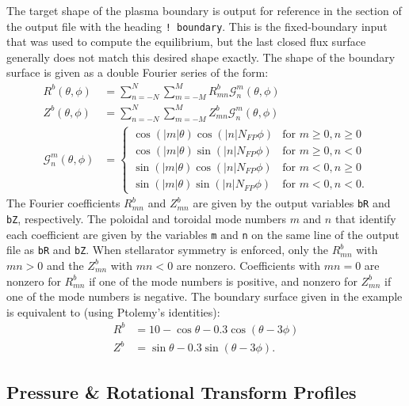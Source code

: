 \documentclass[10pt,a4paper]{article}
\begin{document}
The target shape of the plasma boundary is output for reference in the section of the output file with the heading \verb|! boundary|.  
This is the fixed-boundary input that was used to compute the equilibrium, but the last closed flux surface generally does not match this desired shape exactly.  
The shape of the boundary surface is given as a double Fourier series of the form: 
%
\begin{subequations}
\begin{align}
R^b(\theta,\phi) &= \sum_{n=-N}^{N} \sum_{m=-M}^{M} R^{b}_{mn} \mathcal{G}^{m}_{n}(\theta,\phi) \\
Z^b(\theta,\phi) &= \sum_{n=-N}^{N} \sum_{m=-M}^{M} Z^{b}_{mn} \mathcal{G}^{m}_{n}(\theta,\phi) \\
\label{eq:G}
\mathcal{G}^{m}_{n}(\theta,\phi) &= \begin{cases}
\cos(|m|\theta)\cos(|n|N_{FP}\phi) &\text{for }m\ge0, n\ge0 \\
\cos(|m|\theta)\sin(|n|N_{FP}\phi) &\text{for }m\ge0, n<0 \\
\sin(|m|\theta)\cos(|n|N_{FP}\phi) &\text{for }m<0, n\ge0 \\
\sin(|m|\theta)\sin(|n|N_{FP}\phi) &\text{for }m<0, n<0.
\end{cases}
\end{align}
\end{subequations}
%
The Fourier coefficients $R^{b}_{mn}$ and $Z^{b}_{mn}$ are given by the output variables \verb|bR| and \verb|bZ|, respectively.  
The poloidal and toroidal mode numbers $m$ and $n$ that identify each coefficient are given by the variables \verb|m| and \verb|n| on the same line of the output file as \verb|bR| and \verb|bZ|.  
When stellarator symmetry is enforced, only the $R^{b}_{mn}$ with $mn > 0$ and the $Z^{b}_{mn}$ with $mn < 0$ are nonzero.  
Coefficients with $mn = 0$ are nonzero for $R^{b}_{mn}$ if one of the mode numbers is positive, and nonzero for $Z^{b}_{mn}$ if one of the mode numbers is negative.  
The boundary surface given in the example is equivalent to (using Ptolemy's identities): 
%
\begin{subequations}
\begin{align*}
R^b &= 10 - \cos\theta - 0.3 \cos(\theta-3\phi) \\
Z^b &= \sin\theta - 0.3 \sin(\theta-3\phi).
\end{align*}
\end{subequations}

\subsection*{Pressure \& Rotational Transform Profiles}
\end{document}
